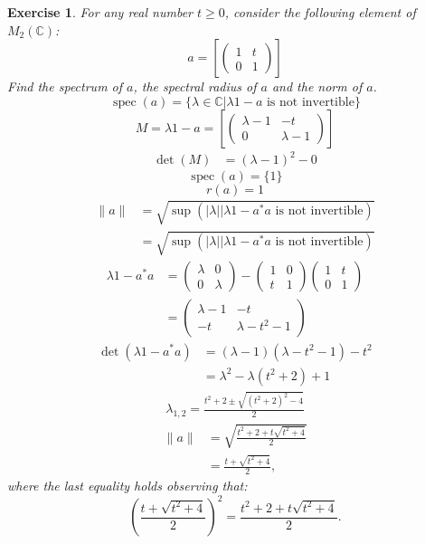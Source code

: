 \documentclass{book}
\newtheorem{exercise}{Exercise}[section]
\begin{document}
\begin{exercise}
For any real number \(t\geq0\), consider the following element of \(M_2(\mathbb{C})\):
\[
a =
\left[\begin{pmatrix}
  1&t \\ 0&1
\end{pmatrix}\right] 
\]
Find the spectrum of \(a\), the spectral radius of \(a\) and the norm of \(a\).
\[
  \operatorname{spec}(a)=\{\lambda\in\mathbb{C}| \lambda1-a \mbox{ is not invertible}\}
\] 
\[
  M=\lambda1-a = 
  \left[\begin{pmatrix}
    \lambda-1&-t \\ 0&\lambda-1
  \end{pmatrix}\right] 
\]
\begin{align*} 
  \det(M)&={(\lambda-1)}^2-0
\end{align*}
\[\operatorname{spec}(a)=\{1\}\]
\[r(a)=1\]
\begin{align*}
  \|a\|&=\sqrt{\sup(|\lambda||\lambda1-a^*a\mbox{ is not invertible})}\\
  &=\sqrt{\sup(|\lambda||\lambda1-a^*a\mbox{ is not invertible})}
\end{align*}
\begin{align*}
  \lambda1-a^*a&=
  \begin{pmatrix}
    \lambda&0\\0&\lambda
  \end{pmatrix}-
  \begin{pmatrix}
    1&0\\t&1
  \end{pmatrix}
  \begin{pmatrix}
  1&t \\ 0&1
\end{pmatrix}\\
&=
  \begin{pmatrix}
    \lambda-1&-t\\-t&\lambda-t^2-1
  \end{pmatrix}
\end{align*}
\begin{align*}
  \det(\lambda1-a^*a)&=(\lambda-1)(\lambda-t^2-1)-t^2\\
  &=\lambda^2-\lambda(t^2+2)+1
\end{align*}
\begin{align*}
  \lambda_{1,2}=\frac{t^2+2\pm \sqrt{(t^2+2)^2-4}}{2}
\end{align*}
\begin{align*}
  \|a\|&=\sqrt{\frac{t^2+2+ t\sqrt{t^2+4}}{2}}\\
  &=\frac{t+\sqrt{t^2+4}}{2},
\end{align*}
where the last equality holds observing that:
\[
  \left(\frac{t+\sqrt{t^2+4}}{2}\right)^2=\frac{t^2+2+t\sqrt{t^2+4}}{2}.
\]
\end{exercise}
\end{document}
